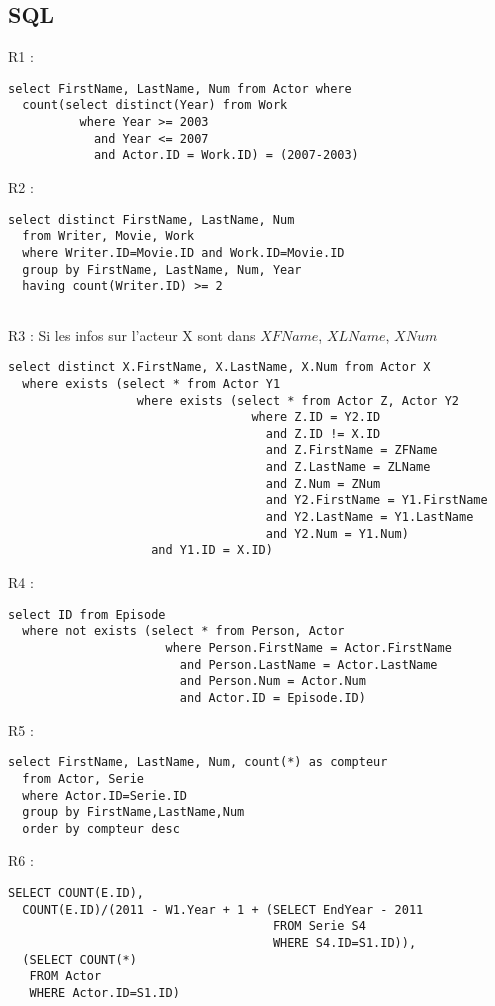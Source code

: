 \documentclass[a4paper,12pt]{article}
\begin{document}
\subsection{SQL}
\begin{list}{-}{}
  \item R1 :
    \begin{lstlisting}
select FirstName, LastName, Num from Actor where
  count(select distinct(Year) from Work
          where Year >= 2003 
            and Year <= 2007
            and Actor.ID = Work.ID) = (2007-2003)

    \end{lstlisting}
  \item R2 :
    \begin{lstlisting}
select distinct FirstName, LastName, Num
  from Writer, Movie, Work
  where Writer.ID=Movie.ID and Work.ID=Movie.ID
  group by FirstName, LastName, Num, Year
  having count(Writer.ID) >= 2
    
    \end{lstlisting}
  \item R3 :
    Si les infos sur l'acteur X sont dans $XFName$, $XLName$, $XNum$
    \begin{lstlisting}
select distinct X.FirstName, X.LastName, X.Num from Actor X
  where exists (select * from Actor Y1
                  where exists (select * from Actor Z, Actor Y2 
                                  where Z.ID = Y2.ID
                                    and Z.ID != X.ID
                                    and Z.FirstName = ZFName
                                    and Z.LastName = ZLName
                                    and Z.Num = ZNum
                                    and Y2.FirstName = Y1.FirstName
                                    and Y2.LastName = Y1.LastName
                                    and Y2.Num = Y1.Num)
                    and Y1.ID = X.ID)
    \end{lstlisting}
  \item R4 :
    \begin{lstlisting}
select ID from Episode
  where not exists (select * from Person, Actor
                      where Person.FirstName = Actor.FirstName
                        and Person.LastName = Actor.LastName
                        and Person.Num = Actor.Num
                        and Actor.ID = Episode.ID)
    \end{lstlisting}
  \item R5 :
    \begin{lstlisting}
select FirstName, LastName, Num, count(*) as compteur
  from Actor, Serie
  where Actor.ID=Serie.ID
  group by FirstName,LastName,Num
  order by compteur desc
    \end{lstlisting}
  \item R6 :
    \begin{lstlisting}
SELECT COUNT(E.ID),
  COUNT(E.ID)/(2011 - W1.Year + 1 + (SELECT EndYear - 2011
                                     FROM Serie S4
                                     WHERE S4.ID=S1.ID)),
  (SELECT COUNT(*)
   FROM Actor
   WHERE Actor.ID=S1.ID)
       

\end{lstlisting}
\end{list}
\end{document}
